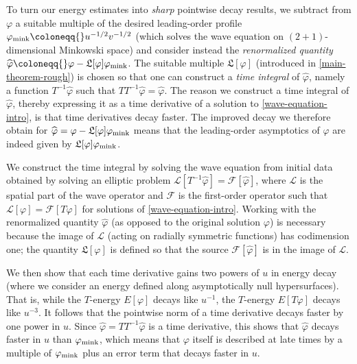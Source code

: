 \documentclass[10pt, reqno]{amsart}
\begin{document}
To turn our energy estimates into \emph{sharp} pointwise decay results, we subtract
from \(\varphi{}\) a suitable multiple of the desired leading-order profile
\(\varphi_{\textnormal{mink}}\coloneqq{}u^{-1/2}v^{-1/2}\) (which solves the
wave equation on \((2 + 1)\)-dimensional Minkowski space) and consider instead
the \emph{renormalized quantity}
\(\widehat{\varphi{}}\coloneqq{}\varphi{}-\mathfrak{L}[\varphi{}]\varphi_{\textnormal{mink}}\). The suitable multiple
\(\mathfrak{L}[\varphi{}]\) (introduced in \cref{main-theorem-rough}) is chosen so
that one can construct a \emph{time integral} of \(\widehat{\varphi{}}\), namely a
function \(T^{-1}\widehat{\varphi{}}\) such that \(TT^{-1}\widehat{\varphi{}} =
\widehat{\varphi{}}\). The reason we construct a time integral of
\(\widehat{\varphi{}}\), thereby expressing it as a time derivative of a
solution to \cref{wave-equation-intro}, is that time derivatives decay faster. The
improved decay we therefore obtain for \(\widehat{\varphi{}} =
\varphi{}-\mathfrak{L}[\varphi{}]\varphi_{\textnormal{mink}}\) means that the
leading-order asymptotics of \(\varphi{}\) are indeed given by
\(\mathfrak{L}[\varphi{}]\varphi_{\textnormal{mink}}\).

We construct the time integral by solving the wave equation from initial data
obtained by solving an elliptic problem \(\mathcal{L}[T^{-1}\widehat{\varphi{}}]
= \mathcal{F}[\widehat{\varphi{}}]\), where \(\mathcal{L}\) is the spatial part
of the wave operator and \(\mathcal{F}\) is the first-order operator such that
\(\mathcal{L}[\varphi{}] = \mathcal{F}[T\varphi{}]\) for solutions of
\cref{wave-equation-intro}. Working with the renormalized quantity
\(\widehat{\varphi{}}\) (as opposed to the original solution \(\varphi{}\)) is
necessary because the image of \(\mathcal{L}\) (acting on radially symmetric
functions) has codimension one; the quantity \(\mathfrak{L}[\varphi{}]\) is
defined so that the source \(\mathcal{F}[\widehat{\varphi{}}]\) is in the image of
\(\mathcal{L}\).

We then show that each time derivative gains two powers of \(u\) in energy decay
(where we consider an energy defined along asymptotically null hypersurfaces).
That is, while the \(T\)-energy \(E[\varphi{}]\) decays like \(u^{-1}\), the
\(T\)-energy \(E[T\varphi{}]\) decays like \(u^{-3}\). It follows that the
pointwise norm of a time derivative decays faster by one power in \(u\). Since
\(\widehat{\varphi{}} = TT^{-1}\widehat{\varphi{}}\) is a time derivative, this
shows that \(\widehat{\varphi{}}\) decays faster in \(u\) than
\(\varphi_{\textnormal{mink}}\), which means that \(\varphi{}\) itself is
described at late times by a multiple of \(\varphi_{\textnormal{mink}}\) plus an
error term that decays faster in \(u\).
\end{document}
